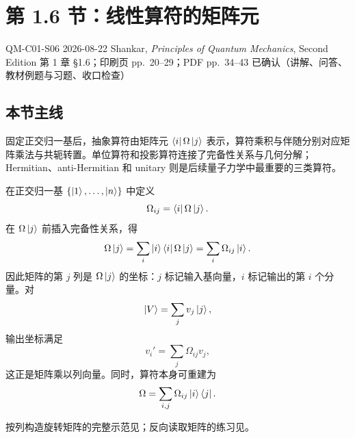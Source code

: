 \section{第 1.6 节：线性算符的矩阵元}
\label{section:QM-C01-S06}

\studymeta
  {QM-C01-S06}
  {2026-08-22}
  {Shankar, \textit{Principles of Quantum Mechanics}, Second Edition}
  {第 1 章 \S 1.6；印刷页 pp.~20--29；PDF pp.~34--43}
  {已确认（讲解、问答、教材例题与习题、收口检查）}

\subsection{本节主线}

固定正交归一基后，抽象算符由矩阵元 $\left\langle i\right|\Omega\left|j\right\rangle$ 表示，算符乘积与伴随分别对应矩阵乘法与共轭转置。单位算符和投影算符连接了完备性关系与几何分解；Hermitian、anti-Hermitian 和 unitary 则是后续量子力学中最重要的三类算符。


在正交归一基 $\{\left|1\right\rangle,\ldots,\left|n\right\rangle\}$ 中定义
\begin{equation}
  \Omega_{ij}=\left\langle i\right|\Omega\left|j\right\rangle.
  \label{eq:QM-C01-S06-matrix-element}
\end{equation}
在 $\Omega\left|j\right\rangle$ 前插入完备性关系，得
\begin{equation}
  \Omega\left|j\right\rangle
  =\sum_i\left|i\right\rangle\left\langle i\right|\Omega\left|j\right\rangle
  =\sum_i\Omega_{ij}\left|i\right\rangle.
  \label{eq:QM-C01-S06-column-rule}
\end{equation}
因此矩阵的第 $j$ 列是 $\Omega\left|j\right\rangle$ 的坐标：$j$ 标记输入基向量，$i$ 标记输出的第 $i$ 个分量。对
\[
  \left|V\right\rangle=\sum_jv_j\left|j\right\rangle,
\]
输出坐标满足
\begin{equation}
  v_i'=\sum_j\Omega_{ij}v_j,
  \label{eq:QM-C01-S06-matrix-action}
\end{equation}
这正是矩阵乘以列向量。同时，算符本身可重建为
\begin{equation}
  \Omega=\sum_{i,j}\Omega_{ij}\left|i\right\rangle\left\langle j\right|.
  \label{eq:QM-C01-S06-operator-expansion}
\end{equation}

按列构造旋转矩阵的完整示范见；反向读取矩阵的练习见。


